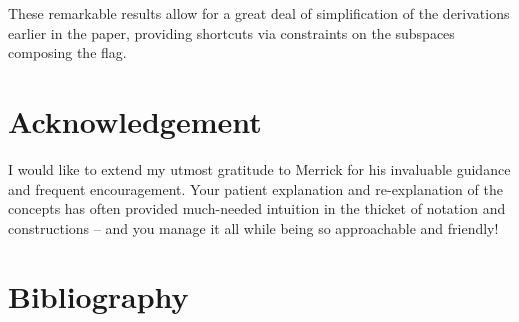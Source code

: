 \documentclass[11pt]{article}
\theoremstyle{definition}
\numberwithin{equation}{section} %
\begin{document}
\noindent These remarkable results allow for a great deal of simplification of the derivations earlier in the paper, providing shortcuts via constraints on the subspaces composing the flag. 

\section{Acknowledgement}
I would like to extend my utmost gratitude to Merrick for his invaluable guidance and frequent encouragement. Your patient explanation and re-explanation of the concepts has often provided much-needed intuition in the thicket of notation and constructions -- and you manage it all while being so approachable and friendly!

\section{Bibliography}
\nocite{Borel1991LinearAlgebraicGroups,Serre2001ComplexSemisimpleLieAlgebras,ChrissGinzburg2010RepresentationTheoryComplexGeometry,Axler2024LinearAlgebraDoneRight,Harris1992AlgebraicGeometryFirstCourse,Vargas1979FixedPointsUnipotent,Fung2003TopologySpringerFibers,ClassLectureNotes}



\end{document}

